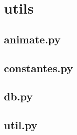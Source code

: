 \chapter{utils}
	\section{animate.py}
	
	
	\section{constantes.py}
	
	
	\section{db.py}
	
	
	\section{util.py}
	
	